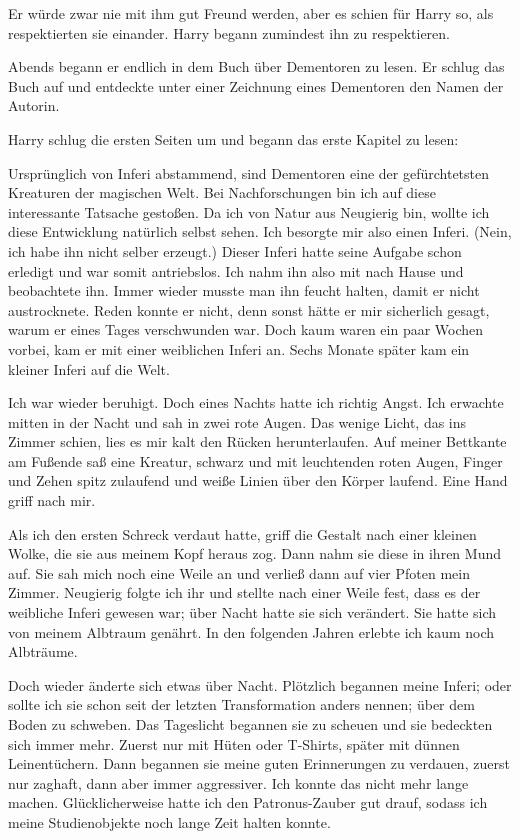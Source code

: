 Er würde zwar nie mit ihm gut Freund werden, aber es schien für Harry so, als respektierten sie einander. Harry begann zumindest ihn zu respektieren.

Abends begann er endlich in dem Buch über Dementoren zu lesen. Er schlug das Buch auf und entdeckte unter einer Zeichnung eines Dementoren den Namen der Autorin. 

Harry schlug die ersten Seiten um und begann das erste Kapitel zu lesen:

\begin{buch}

Ursprünglich von Inferi abstammend, sind Dementoren eine der gefürchtetsten Kreaturen der magischen Welt. Bei Nachforschungen bin ich auf diese interessante Tatsache gestoßen. Da ich von Natur aus Neugierig bin, wollte ich diese Entwicklung natürlich selbst sehen. Ich besorgte mir also einen Inferi. (Nein, ich habe ihn nicht selber erzeugt.) Dieser Inferi hatte seine Aufgabe schon erledigt und war somit antriebslos. Ich nahm ihn also mit nach Hause und beobachtete ihn. Immer wieder musste man ihn feucht halten, damit er nicht austrocknete. Reden konnte er nicht, denn sonst hätte er mir sicherlich gesagt, warum er eines Tages verschwunden war. Doch kaum waren ein paar Wochen vorbei, kam er mit einer weiblichen Inferi an. Sechs Monate später kam ein kleiner Inferi auf die Welt.

Ich war wieder beruhigt. Doch eines Nachts hatte ich richtig Angst. Ich erwachte mitten in der Nacht und sah in zwei rote Augen. Das wenige Licht, das ins Zimmer schien, lies es mir kalt den Rücken herunterlaufen. Auf meiner Bettkante am Fußende saß eine Kreatur, schwarz und mit leuchtenden roten Augen, Finger und Zehen spitz zulaufend und weiße Linien über den Körper laufend. Eine Hand griff nach mir.

Als ich den ersten Schreck verdaut hatte, griff die Gestalt nach einer kleinen Wolke, die sie aus meinem Kopf heraus zog. Dann nahm sie diese in ihren Mund auf. Sie sah mich noch eine Weile an und verließ dann auf vier Pfoten mein Zimmer. Neugierig folgte ich ihr und stellte nach einer Weile fest, dass es der weibliche Inferi gewesen war; über Nacht hatte sie sich verändert. Sie hatte sich von meinem Albtraum genährt. In den folgenden Jahren erlebte ich kaum noch Albträume.

Doch wieder änderte sich etwas über Nacht. Plötzlich begannen meine Inferi; oder sollte ich sie schon seit der letzten Transformation anders nennen; über dem Boden zu schweben. Das Tageslicht begannen sie zu scheuen und sie bedeckten sich immer mehr. Zuerst nur mit Hüten oder T-Shirts, später mit dünnen Leinentüchern. Dann begannen sie meine guten Erinnerungen zu verdauen, zuerst nur zaghaft, dann aber immer aggressiver. Ich konnte das nicht mehr lange machen. Glücklicherweise hatte ich den Patronus-Zauber gut drauf, sodass ich meine Studienobjekte noch lange Zeit halten konnte.


\end{buch}
